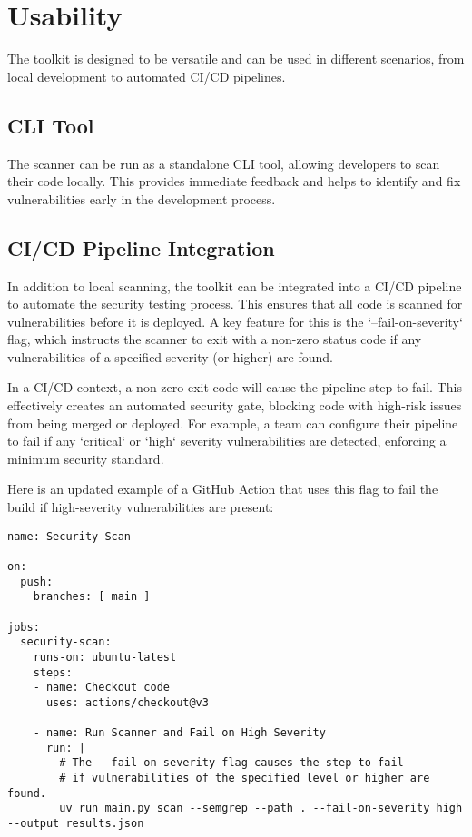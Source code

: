 \section{Usability}

The toolkit is designed to be versatile and can be used in different scenarios, from local development to automated CI/CD pipelines.

\subsection{CLI Tool}

The scanner can be run as a standalone CLI tool, allowing developers to scan their code locally. This provides immediate feedback and helps to identify and fix vulnerabilities early in the development process.

\subsection{CI/CD Pipeline Integration}

In addition to local scanning, the toolkit can be integrated into a CI/CD pipeline to automate the security testing process. This ensures that all code is scanned for vulnerabilities before it is deployed. A key feature for this is the `--fail-on-severity` flag, which instructs the scanner to exit with a non-zero status code if any vulnerabilities of a specified severity (or higher) are found.

In a CI/CD context, a non-zero exit code will cause the pipeline step to fail. This effectively creates an automated security gate, blocking code with high-risk issues from being merged or deployed. For example, a team can configure their pipeline to fail if any `critical` or `high` severity vulnerabilities are detected, enforcing a minimum security standard.

Here is an updated example of a GitHub Action that uses this flag to fail the build if high-severity vulnerabilities are present:

\begin{verbatim}
name: Security Scan

on:
  push:
    branches: [ main ]

jobs:
  security-scan:
    runs-on: ubuntu-latest
    steps:
    - name: Checkout code
      uses: actions/checkout@v3

    - name: Run Scanner and Fail on High Severity
      run: |
        # The --fail-on-severity flag causes the step to fail
        # if vulnerabilities of the specified level or higher are found.
        uv run main.py scan --semgrep --path . --fail-on-severity high --output results.json
\end{verbatim}

